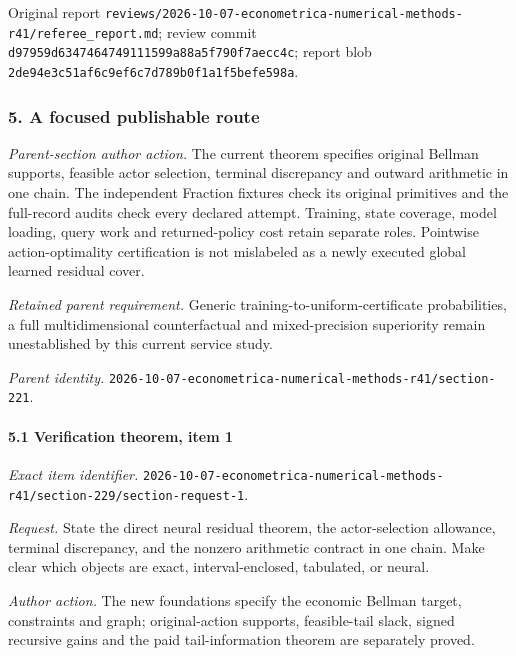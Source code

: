 Original report \nolinkurl{reviews/2026-10-07-econometrica-numerical-methods-r41/referee_report.md}; review commit \nolinkurl{d97959d6347464749111599a88a5f790f7aecc4c}; report blob \nolinkurl{2de94e3c51af6c9ef6c7d789b0f1a1f5befe598a}.

\subsubsection{5. A focused publishable route}

\emph{Parent-section author action.} The current theorem specifies original Bellman supports, feasible actor selection, terminal discrepancy and outward arithmetic in one chain. The independent Fraction fixtures check its original primitives and the full-record audits check every declared attempt. Training, state coverage, model loading, query work and returned-policy cost retain separate roles. Pointwise action-optimality certification is not mislabeled as a newly executed global learned residual cover.

\par\emph{Retained parent requirement.} Generic training-to-uniform-certificate probabilities, a full multidimensional counterfactual and mixed-precision superiority remain unestablished by this current service study.

\par\emph{Parent identity.} \nolinkurl{2026-10-07-econometrica-numerical-methods-r41/section-221}.

\paragraph{5.1 Verification theorem, item 1}

\emph{Exact item identifier.} \nolinkurl{2026-10-07-econometrica-numerical-methods-r41/section-229/section-request-1}.

\par\emph{Request.} State the direct neural residual theorem, the actor-selection allowance, terminal discrepancy, and the nonzero arithmetic contract in one chain. Make clear which objects are exact, interval-enclosed, tabulated, or neural.

\par\emph{Author action.} The new foundations specify the economic Bellman target, constraints and graph; original-action supports, feasible-tail slack, signed recursive gains and the paid tail-information theorem are separately proved.

